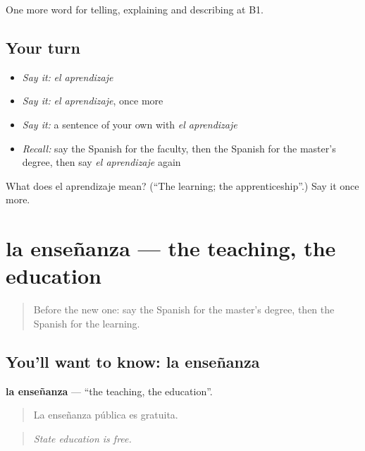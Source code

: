 \begin{grammarlens}[title={What you've built}]
One more word for telling, explaining and describing at B1.
\end{grammarlens}

\subsection*{Your turn}
\begin{itemize}
\raggedright
  \item \emph{Say it:} \emph{el aprendizaje}
  \item \emph{Say it:} \emph{el aprendizaje}, once more
  \item \emph{Say it:} a sentence of your own with \emph{el aprendizaje}
  \item \emph{Recall:} say the Spanish for the faculty, then the Spanish for the master's degree, then say \emph{el aprendizaje} again
\end{itemize}

\begin{tcolorbox}[breakable,colback=teal!4,colframe=teal!35!black,title={Before you move on}]
What does el aprendizaje mean? (\textquotedblleft{}The learning; the apprenticeship\textquotedblright{}.) Say it once more.
\end{tcolorbox}
\section[la enseñanza]{la enseñanza — the teaching, the education}

\label{lesson:ES-C597-ensenanza}



\begin{quote}
Before the new one: say the Spanish for the master's degree, then the Spanish for the learning.
\end{quote}

\subsection*{You'll want to know: la enseñanza}
\textbf{la enseñanza} — \textquotedblleft{}the teaching, the education\textquotedblright{}.

\begin{quote}
La enseñanza pública es gratuita.
\end{quote}

\begin{quote}
\emph{State education is free.}
\end{quote}

